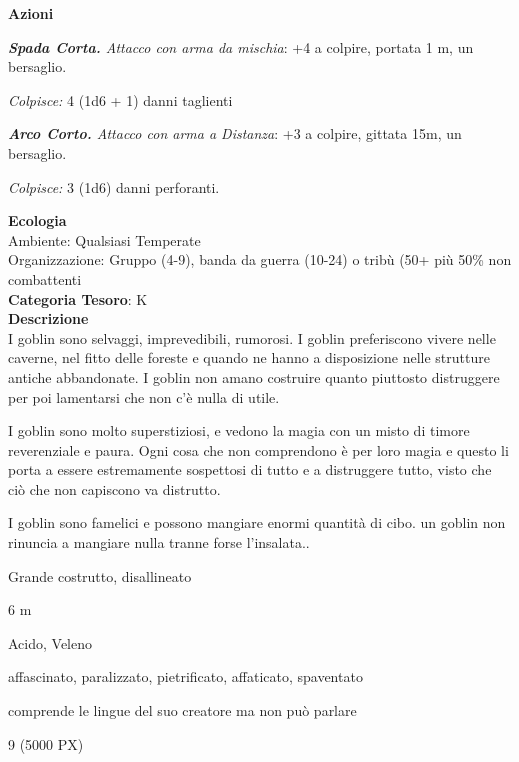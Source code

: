 \begin{multicols}{2}
{\textbf{Azioni}

\emph{\textbf{Spada Corta.} Attacco con arma da mischia}: +4 a colpire, portata 1 m, un bersaglio.

\emph{Colpisce:} 4 (1d6 + 1) danni taglienti

\emph{\textbf{Arco Corto.} Attacco con arma a Distanza}: +3 a colpire, gittata 15m, un bersaglio.

\emph{Colpisce:} 3 (1d6) danni perforanti.

\textbf{Ecologia}\\
Ambiente: Qualsiasi Temperate\\
Organizzazione: Gruppo (4-9), banda da guerra (10-24) o tribù (50+ più 50\% non combattenti\\
\textbf{Categoria Tesoro}: K\\
\textbf{Descrizione}\\
I goblin sono selvaggi, imprevedibili, rumorosi.
I goblin preferiscono vivere nelle caverne, nel fitto delle foreste e quando ne hanno a disposizione nelle strutture antiche abbandonate. I goblin non amano costruire quanto piuttosto distruggere per poi lamentarsi che non c'è nulla di utile.

I goblin sono molto superstiziosi, e vedono la magia con un misto di timore reverenziale e paura. Ogni cosa che non comprendono è per loro magia e questo li porta a essere estremamente sospettosi di tutto e a distruggere tutto, visto che ciò che non capiscono va distrutto.

I goblin sono famelici e possono mangiare enormi quantità di cibo. un goblin non rinuncia a mangiare nulla tranne forse l'insalata..

\begin{description}[noitemsep, topsep=0pt, parsep=0pt, partopsep=0pt, itemsep=1pt, leftmargin=2.35cm,  labelwidth=2.2cm, itemindent=0cm, listparindent=0pt] %
\setlength{\baselineskip}{10pt}
\item[\textbf{Taglia/Tipo}] Grande costrutto, disallineato
\item[\textbf{Caratt.}] 
\item[\textbf{Punti Ferita}] 
\item[\textbf{Movimento}] 6 m
\item[\textbf{Tiri Salvez.}] 
\item[\textbf{Imm. Danni}] Acido, Veleno
\item[\textbf{Immunità}] affascinato, paralizzato, pietrificato, affaticato, spaventato
\item[\textbf{Sensi}] 
\item[\textbf{Linguaggi}] comprende le lingue del suo creatore ma non può parlare
\item[\textbf{Sfida}] 9 (5000 PX)
\end{description}
\smallskip

}
\end{multicols}

